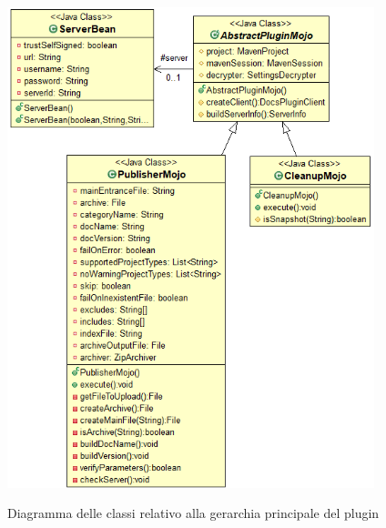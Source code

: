 \begin{figure}[H]
    \centering
    \includegraphics[width=0.95\textwidth]{immagini/mojo-gerarchy.png}\\
    \caption{Diagramma delle classi relativo alla gerarchia principale del plugin}
\end{figure}

